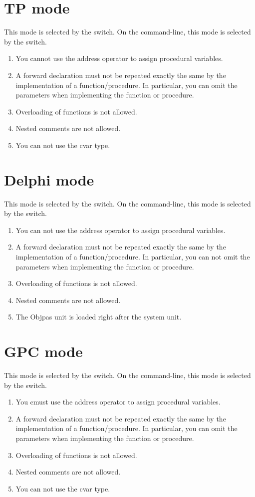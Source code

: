 \documentclass{report}
\begin{document}
\section{TP mode}
This mode is selected by the  switch. On the command-line,
this mode is selected by the  switch.

\begin{enumerate}
\item You cannot use the address operator to assign procedural variables.
\item A forward declaration must not be repeated exactly the same by the
implementation of a function/procedure. In particular, you can omit the
parameters when implementing the function or procedure.
\item Overloading of functions is not allowed.
\item Nested comments are not allowed.
\item You can not use the cvar type.
\end{enumerate}
\section{Delphi mode}
This mode is selected by the  switch. On the command-line,
this mode is selected by the  switch.
\begin{enumerate}
\item You can not use the address operator to assign procedural variables.
\item A forward declaration must not be repeated exactly the same by the
implementation of a function/procedure. In particular, you can not omit the
parameters when implementing the function or procedure.
\item Overloading of functions is not allowed.
\item Nested comments are not  allowed.
\item The Objpas unit is loaded right after the system unit.
\end{enumerate}
\section{GPC mode}
This mode is selected by the  switch. On the command-line,
this mode is selected by the  switch.
\begin{enumerate}
\item You cmust use the address operator to assign procedural variables.
\item A forward declaration must not be repeated exactly the same by the
implementation of a function/procedure. In particular, you can omit the
parameters when implementing the function or procedure.
\item Overloading of functions is not allowed.
\item Nested comments are not allowed.
\item You can not use the cvar type.
\end{enumerate}
\end{document}
